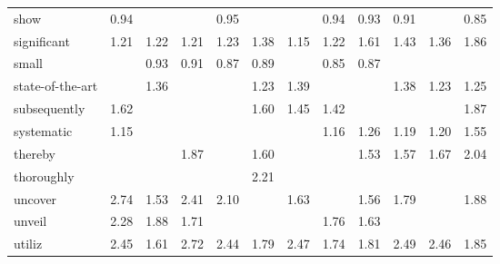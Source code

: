 \begin{tabular}{|l|c|c|c|c|c|c|c|c|c|c|c|}
show & \cellcolor{yellow!18} 0.94 &  &  & \cellcolor{yellow!19} 0.95 &  &  & \cellcolor{yellow!18} 0.94 & \cellcolor{yellow!18} 0.93 & \cellcolor{yellow!18} 0.91 &  & \cellcolor{yellow!17} 0.85 \\
significant & \cellcolor{yellow!24} 1.21 & \cellcolor{yellow!24} 1.22 & \cellcolor{yellow!24} 1.21 & \cellcolor{yellow!24} 1.23 & \cellcolor{yellow!27} 1.38 & \cellcolor{yellow!23} 1.15 & \cellcolor{yellow!24} 1.22 & \cellcolor{yellow!32} 1.61 & \cellcolor{yellow!28} 1.43 & \cellcolor{yellow!27} 1.36 & \cellcolor{yellow!37} 1.86 \\
small &  & \cellcolor{yellow!18} 0.93 & \cellcolor{yellow!18} 0.91 & \cellcolor{yellow!17} 0.87 & \cellcolor{yellow!17} 0.89 &  & \cellcolor{yellow!17} 0.85 & \cellcolor{yellow!17} 0.87 &  &  &  \\
state-of-the-art &  & \cellcolor{yellow!27} 1.36 &  &  & \cellcolor{yellow!24} 1.23 & \cellcolor{yellow!27} 1.39 &  &  & \cellcolor{yellow!27} 1.38 & \cellcolor{yellow!24} 1.23 & \cellcolor{yellow!25} 1.25 \\
subsequently & \cellcolor{yellow!32} 1.62 &  &  &  & \cellcolor{yellow!32} 1.60 & \cellcolor{yellow!28} 1.45 & \cellcolor{yellow!28} 1.42 &  &  &  & \cellcolor{yellow!37} 1.87 \\
systematic & \cellcolor{yellow!23} 1.15 &  &  &  &  &  & \cellcolor{yellow!23} 1.16 & \cellcolor{yellow!25} 1.26 & \cellcolor{yellow!23} 1.19 & \cellcolor{yellow!24} 1.20 & \cellcolor{yellow!31} 1.55 \\
thereby &  &  & \cellcolor{yellow!37} 1.87 &  & \cellcolor{yellow!32} 1.60 &  &  & \cellcolor{yellow!30} 1.53 & \cellcolor{yellow!31} 1.57 & \cellcolor{yellow!33} 1.67 & \cellcolor{yellow!40} 2.04 \\
thoroughly &  &  &  &  & \cellcolor{yellow!44} 2.21 &  &  &  &  &  &  \\
uncover & \cellcolor{yellow!54} 2.74 & \cellcolor{yellow!30} 1.53 & \cellcolor{yellow!48} 2.41 & \cellcolor{yellow!42} 2.10 &  & \cellcolor{yellow!32} 1.63 &  & \cellcolor{yellow!31} 1.56 & \cellcolor{yellow!35} 1.79 &  & \cellcolor{yellow!37} 1.88 \\
unveil & \cellcolor{yellow!45} 2.28 & \cellcolor{yellow!37} 1.88 & \cellcolor{yellow!34} 1.71 &  &  &  & \cellcolor{yellow!35} 1.76 & \cellcolor{yellow!32} 1.63 &  &  &  \\
utiliz & \cellcolor{yellow!49} 2.45 & \cellcolor{yellow!32} 1.61 & \cellcolor{yellow!54} 2.72 & \cellcolor{yellow!48} 2.44 & \cellcolor{yellow!35} 1.79 & \cellcolor{yellow!49} 2.47 & \cellcolor{yellow!34} 1.74 & \cellcolor{yellow!36} 1.81 & \cellcolor{yellow!49} 2.49 & \cellcolor{yellow!49} 2.46 & \cellcolor{yellow!37} 1.85 \\

\end{tabular}
